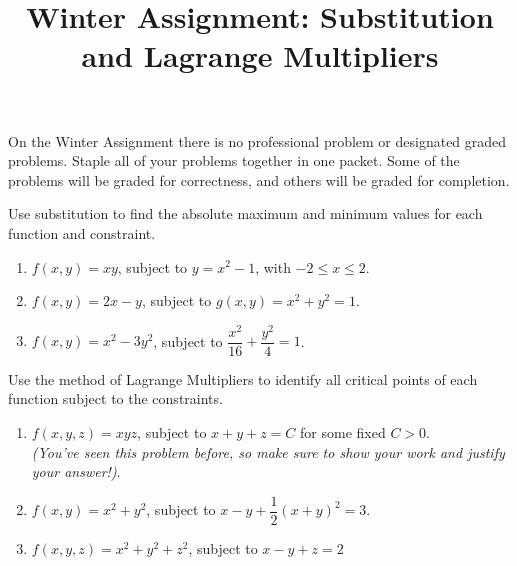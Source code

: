 \documentclass{ximera}
\title{Winter Assignment: Substitution and Lagrange Multipliers}
\begin{document}
\begin{abstract}
\end{abstract}
\maketitle


On the Winter Assignment there is no professional problem or designated graded problems.  Staple all of your problems together in one packet.  Some of the problems will be graded for correctness, and others will be graded for completion.  

\begin{problem}
Use substitution to find the absolute maximum and minimum values for each function and constraint.

\begin{enumerate}
\item $f(x,y)= xy $, subject to $y=x^2-1$, with $-2 \le x \le 2$.

\item $f(x,y)=2x-y$, subject to $g(x,y)=x^2+y^2=1$.

\item $f(x,y)=x^2-3y^2$, subject to $\dfrac{x^2}{16}+\dfrac{y^2}{4}=1$.\end{enumerate}

\end{problem}


\begin{problem}
Use the method of Lagrange Multipliers to identify all critical points of each function subject to the constraints.

\begin{enumerate}

\item $f(x,y,z) = x y z$, subject to $x + y + z = C$ for some fixed $C>0$.\\\textit{(You've seen this problem before, so make sure to show your work and justify your answer!)}.

\item $f(x,y) = x^2+y^2$, subject to $x-y+\dfrac{1}{2}(x+y)^2 = 3$.

\item $f(x,y,z) = x^2 + y^2 + z^2$, subject to $x - y + z = 2$

\end{enumerate}
\end{problem}
\end{document}
